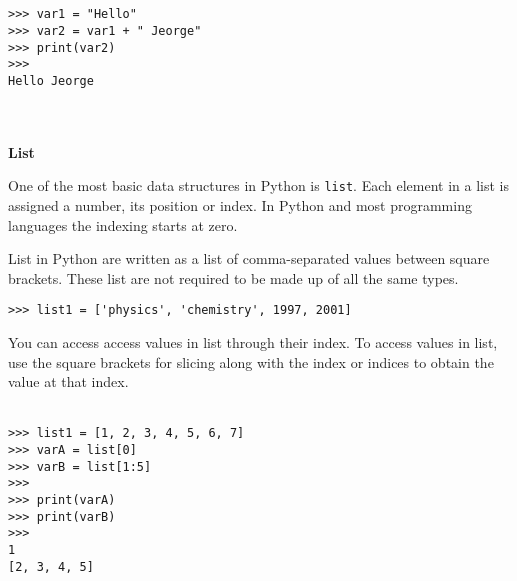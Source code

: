 \documentclass[letterpaper,11pt]{article}
\begin{document}
\\ \\
\begin{minipage}{.5\textwidth}
    \begin{tcolorbox}
        \begin{footnotesize}
            \begin{verbatim}
>>> var1 = "Hello"
>>> var2 = var1 + " Jeorge"
>>> print(var2)
>>>
Hello Jeorge
            \end{verbatim}
        \end{footnotesize}
    \end{tcolorbox}
\end{minipage}
\\ \\
\textbf{List}
\par{One of the most basic data structures in Python is \texttt{list}. Each
element in a list is assigned a number, its position or index. In Python and
most programming languages the indexing starts at zero.}
\par{List in Python are written as a list of comma-separated values between
square brackets. These list are not required to be made up of all the same
types.}
\\
\begin{minipage}{.5\textwidth}
    \begin{tcolorbox}
        \begin{footnotesize}
            \begin{verbatim}
>>> list1 = ['physics', 'chemistry', 1997, 2001]
            \end{verbatim}
        \end{footnotesize}
    \end{tcolorbox}
\end{minipage}
\par{You can access access values in list through their index. To access values
in list, use the square brackets for slicing along with the index or indices to
obtain the value at that index.}
\\ \\
\begin{minipage}{.5\textwidth}
    \begin{tcolorbox}
        \begin{footnotesize}
            \begin{verbatim}
>>> list1 = [1, 2, 3, 4, 5, 6, 7]
>>> varA = list[0]
>>> varB = list[1:5]
>>>
>>> print(varA)
>>> print(varB)
>>>
1
[2, 3, 4, 5]
            \end{verbatim}
        \end{footnotesize}
    \end{tcolorbox}
\end{minipage}
\end{document}

